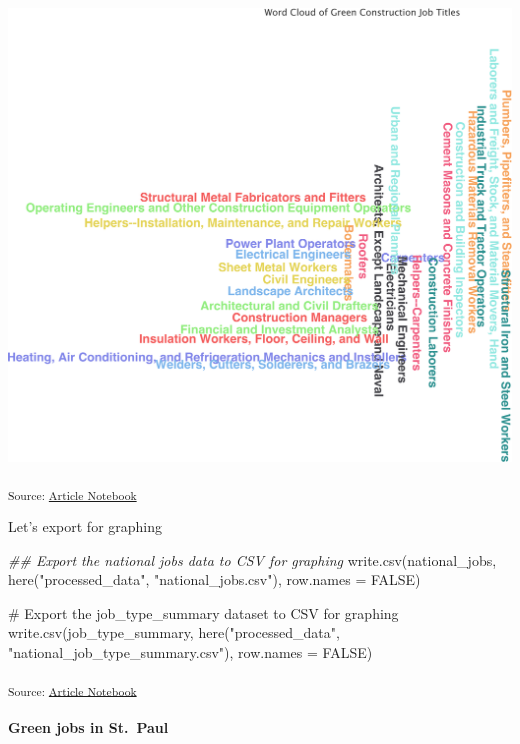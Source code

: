 \documentclass[
  letterpaper,
  DIV=11,
  numbers=noendperiod]{scrartcl}
\let\oldparagraph\paragraph
\renewcommand{\paragraph}[1]{\oldparagraph{#1}\mbox{}}
\newenvironment{Shaded}{\begin{snugshade}}{\end{snugshade}}
\newcommand{\AttributeTok}[1]{\textcolor[rgb]{0.40,0.45,0.13}{#1}}
\newcommand{\CommentTok}[1]{\textcolor[rgb]{0.37,0.37,0.37}{#1}}
\newcommand{\ConstantTok}[1]{\textcolor[rgb]{0.56,0.35,0.01}{#1}}
\newcommand{\DocumentationTok}[1]{\textcolor[rgb]{0.37,0.37,0.37}{\textit{#1}}}
\newcommand{\FunctionTok}[1]{\textcolor[rgb]{0.28,0.35,0.67}{#1}}
\newcommand{\NormalTok}[1]{\textcolor[rgb]{0.00,0.23,0.31}{#1}}
\newcommand{\StringTok}[1]{\textcolor[rgb]{0.13,0.47,0.30}{#1}}
\begin{document}
\includegraphics{index_files/figure-pdf/unnamed-chunk-17-3.pdf}

\textsubscript{Source:
\href{https://beeckcenter.github.io/climate-equity-workforce/index-preview.html}{Article
Notebook}}

Let's export for graphing

\begin{Shaded}
\begin{Highlighting}[]
\DocumentationTok{\#\# Export the national jobs data to CSV for graphing}
\FunctionTok{write.csv}\NormalTok{(national\_jobs, }\FunctionTok{here}\NormalTok{(}\StringTok{"processed\_data"}\NormalTok{, }\StringTok{"national\_jobs.csv"}\NormalTok{), }\AttributeTok{row.names =} \ConstantTok{FALSE}\NormalTok{)}

\CommentTok{\# Export the job\_type\_summary dataset to CSV for graphing}
\FunctionTok{write.csv}\NormalTok{(job\_type\_summary, }\FunctionTok{here}\NormalTok{(}\StringTok{"processed\_data"}\NormalTok{, }\StringTok{"national\_job\_type\_summary.csv"}\NormalTok{), }\AttributeTok{row.names =} \ConstantTok{FALSE}\NormalTok{)}
\end{Highlighting}
\end{Shaded}

\textsubscript{Source:
\href{https://beeckcenter.github.io/climate-equity-workforce/index-preview.html}{Article
Notebook}}

\paragraph{Green jobs in St.~Paul}\label{green-jobs-in-st.-paul}
\end{document}
